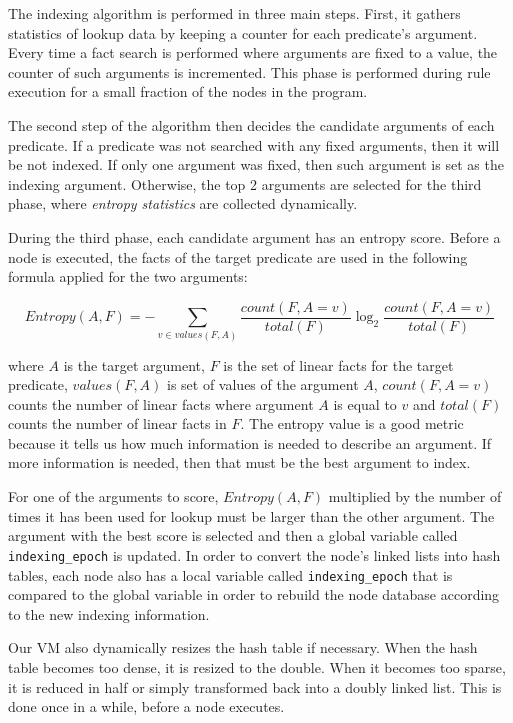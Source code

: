 \documentclass{sigplanconf}
\begin{document}
The indexing algorithm is performed in three main steps. First, it
gathers statistics of lookup data by keeping a counter for each
predicate's argument.  Every time a fact search is performed where
arguments are fixed to a value, the counter of such arguments is
incremented. This phase is performed during rule execution for a small
fraction of the nodes in the program.

The second step of the algorithm then decides the candidate arguments
of each predicate.  If a predicate was not searched with any fixed
arguments, then it will be not indexed.  If only one argument was
fixed, then such argument is set as the indexing argument. Otherwise,
the top 2 arguments are selected for the third phase,
where \emph{entropy statistics} are collected dynamically.

During the third phase, each candidate argument has an entropy score.
Before a node is executed, the facts of the target predicate
are used in the following formula applied for the two arguments:

{\tiny
\[
Entropy(A, F) = - \sum_{v \in values(F, A)} \frac{count(F, A = v)}{total(F)} \log_2 \frac{count(F, A = v)}{total(F)}
\]
}

\noindent
where $A$ is the target argument, $F$ is the set of linear facts
for the target predicate, $values(F, A)$ is set of values of the
argument $A$, $count(F, A = v)$ counts the number of linear facts
where argument $A$ is equal to $v$ and $total(F)$ counts the number of
linear facts in $F$.  The entropy value is a good metric because it
tells us how much information is needed to describe an argument.  If
more information is needed, then that must be the best argument to
index.

For one of the arguments to score, $Entropy(A, F)$ multiplied by the
number of times it has been used for lookup must be larger than the
other argument. The argument with the best score is selected and then
a global variable called \texttt{indexing\_epoch} is updated.  In
order to convert the node's linked lists into hash tables, each node
also has a local variable called \texttt{indexing\_epoch} that is
compared to the global variable in order to rebuild the node database
according to the new indexing information.

Our VM also dynamically resizes the hash table if necessary. When the
hash table becomes too dense, it is resized to the double. When it
becomes too sparse, it is reduced in half or simply transformed back
into a doubly linked list. This is done once in a while, before a node
executes.
\end{document}
